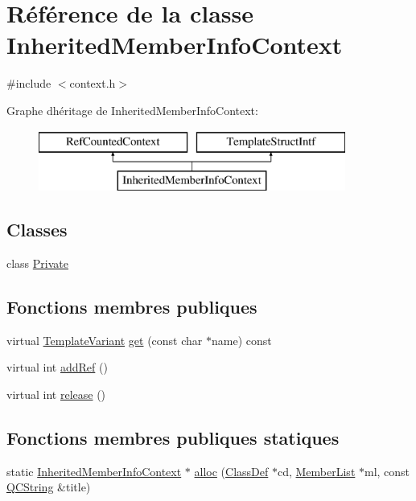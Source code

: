 \hypertarget{class_inherited_member_info_context}{}\section{Référence de la classe Inherited\+Member\+Info\+Context}
\label{class_inherited_member_info_context}


{\ttfamily \#include $<$context.\+h$>$}

Graphe d\textquotesingle{}héritage de Inherited\+Member\+Info\+Context\+:\begin{figure}[H]
\begin{center}
\leavevmode
\includegraphics[height=2.000000cm]{class_inherited_member_info_context}
\end{center}
\end{figure}
\subsection*{Classes}
\begin{DoxyCompactItemize}
\item 
class \hyperlink{class_inherited_member_info_context_1_1_private}{Private}
\end{DoxyCompactItemize}
\subsection*{Fonctions membres publiques}
\begin{DoxyCompactItemize}
\item 
virtual \hyperlink{class_template_variant}{Template\+Variant} \hyperlink{class_inherited_member_info_context_a5ffd55398116cf680d4d84bc9956eca3}{get} (const char $\ast$name) const 
\item 
virtual int \hyperlink{class_inherited_member_info_context_a38bbd0b70b99adbf488dbf2e72753a51}{add\+Ref} ()
\item 
virtual int \hyperlink{class_inherited_member_info_context_a285fdfc40bae5fb0a66ad5a38781ee05}{release} ()
\end{DoxyCompactItemize}
\subsection*{Fonctions membres publiques statiques}
\begin{DoxyCompactItemize}
\item 
static \hyperlink{class_inherited_member_info_context}{Inherited\+Member\+Info\+Context} $\ast$ \hyperlink{class_inherited_member_info_context_af04d4694d03a4fc7b9f92206873a9751}{alloc} (\hyperlink{class_class_def}{Class\+Def} $\ast$cd, \hyperlink{class_member_list}{Member\+List} $\ast$ml, const \hyperlink{class_q_c_string}{Q\+C\+String} \&title)
\end{DoxyCompactItemize}


